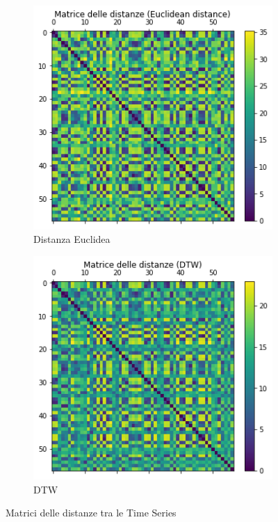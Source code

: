\documentclass[a4paper]{article}
\begin{document}
\begin{figure}[h]
\centering
\begin{subfigure}[b]{.30\linewidth}
\includegraphics[width=\linewidth]{images/euclidean.png}
\caption{Distanza Euclidea}
\label{subfig:eucl}
\end{subfigure}
\begin{subfigure}[b]{.30\linewidth}
\includegraphics[width=\linewidth]{images/dtw_sqrt.png}
\caption{DTW}
\label{subfig:dtw}
\end{subfigure}
\caption{Matrici delle distanze tra le Time Series}
\label{fig:distance_matrixes}
\end{figure}
\end{document}
